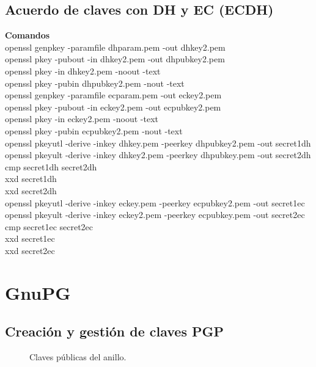 \documentclass[11pt]{article}
\begin{document}
    \subsection{Acuerdo de claves con DH y EC (ECDH)} \label{ecdh}
    \par
    \textbf{Comandos}\\
    openssl genpkey -paramfile dhparam.pem -out dhkey2.pem\\
    openssl pkey -pubout -in dhkey2.pem -out dhpubkey2.pem\\
    openssl pkey -in dhkey2.pem -noout -text\\
    openssl pkey -pubin dhpubkey2.pem -nout -text\\
    \vspace{2mm}
    openssl genpkey -paramfile ecparam.pem -out eckey2.pem\\
    openssl pkey -pubout -in eckey2.pem -out ecpubkey2.pem\\
    openssl pkey -in eckey2.pem -noout -text\\
    openssl pkey -pubin ecpubkey2.pem -nout -text\\
    \vspace{2mm}
    openssl pkeyutl -derive -inkey dhkey.pem -peerkey dhpubkey2.pem -out secret1dh\\
    openssl pkeyult -derive -inkey dhkey2.pem -peerkey dhpubkey.pem -out secret2dh\\
    cmp secret1dh secret2dh\\
    xxd secret1dh\\
    xxd secret2dh\\
    \vspace{2mm}
    openssl pkeyutl -derive -inkey eckey.pem -peerkey ecpubkey2.pem -out secret1ec\\
    openssl pkeyult -derive -inkey eckey2.pem -peerkey ecpubkey.pem -out secret2ec\\
    cmp secret1ec secret2ec\\
    xxd secret1ec\\
    xxd secret2ec

  \section{GnuPG}
    \subsection{Creación y gestión de claves PGP}
      \begin{figure}[!ht]
        \centering
        \caption{Claves públicas del anillo.}
      \end{figure}
\end{document}
